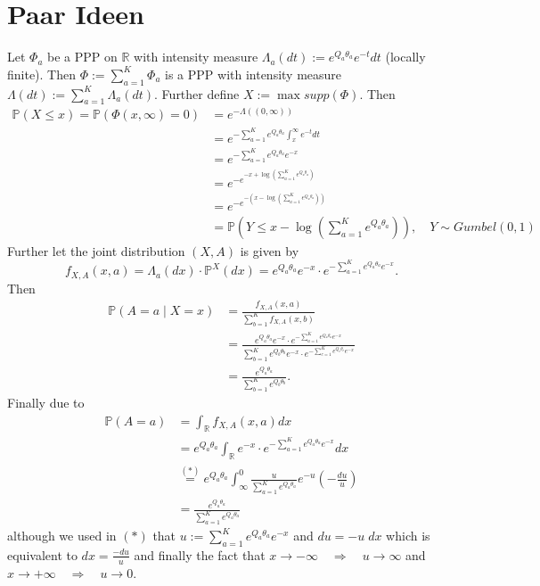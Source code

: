 \documentclass[A4,12pt,twoside]{book}
\begin{document}
\section{Paar Ideen}
Let $\Phi_a$ be a PPP on $\mathbb{R}$ with intensity measure $\Lambda_a (dt) := e^{Q_a \theta_a} e^{-t} dt$ (locally finite). Then $\Phi := \sum_{a=1}^K \Phi_a$ is a PPP with intensity measure $\Lambda (dt) := \sum_{a =1}^K \Lambda_a (dt)$. Further define $X:= \max supp (\Phi)$. Then
\begin{align*}
    \mathbb{P}(X \leq x) = \mathbb{P}(\Phi (x,\infty)=0) &= e^{-\Lambda ((0,\infty))} \\
     &= e^{-\sum_{a =1}^K e^{Q_a \theta_a} \int_x^\infty e^{-t} dt} \\
     &= e^{-\sum_{a =1}^K e^{Q_a \theta_a} e^{-x}} \\
     &= e^{- e^{-x+\log(\sum_{a =1}^K e^{Q_a \theta_a})}}  \\
     &= e^{- e^{-(x-\log(\sum_{a =1}^K e^{Q_a \theta_a}))}}  \\
     &= \mathbb{P}(Y \leq x- \log(\sum_{a =1}^K e^{Q_a \theta_a})), \quad Y \sim Gumbel(0,1)
\end{align*}
Further let the joint distribution $(X,A)$ is given by
$$
f_{X,A} (x,a) = \Lambda_a (dx) \cdot \mathbb{P}^X (dx) = e^{Q_a \theta_a} e^{-x} \cdot e^{-\sum_{a =1}^K e^{Q_a \theta_a} e^{-x}}.
$$
Then    
\begin{align*}
    \mathbb{P}(A=a \mid X=x) &= \frac{f_{X,A}(x,a)}{\sum_{b=1}^K f_{X,A}(x,b)} \\
    &= \frac{e^{Q_a \theta_a} e^{-x} \cdot e^{-\sum_{a =1}^K e^{Q_a \theta_a} e^{-x}}}{\sum_{b=1}^K e^{Q_b \theta_b} e^{-x} \cdot e^{-\sum_{c =1}^K e^{Q_c \theta_c} e^{-x}}} \\
    &= \frac{e^{Q_a\theta_a}}{\sum_{b=1}^K e^{Q_b \theta_b}}.
\end{align*}
Finally due to 
\begin{align*}
    \mathbb{P}(A=a) &= \int_\mathbb{R} f_{X,A} (x,a) dx \\
    &= e^{Q_a \theta_a} \int_\mathbb{R} e^{-x} \cdot e^{-\sum_{a =1}^K e^{Q_a \theta_a} e^{-x}} dx \\
    &\stackrel{(*)}{=} e^{Q_a \theta_a} \int_{\infty}^0 \frac{u}{\sum_{a =1}^K e^{Q_a \theta_a}} e^{-u} (-\frac{du}{u})\\
    &= \frac{e^{Q_a \theta_a} }{\sum_{a =1}^K e^{Q_a \theta_a}}
\end{align*}
although we used in $(*)$ that $u:= \sum_{a =1}^K e^{Q_a \theta_a} e^{-x}$ and $du= -u \; dx$ which is equivalent to $dx = \frac{-du}{u}$ and finally the fact that $x\to -\infty\quad \Rightarrow \quad u\to\infty$ and $x\to+\infty \quad \Rightarrow \quad u\to0$.\\
\end{document}
